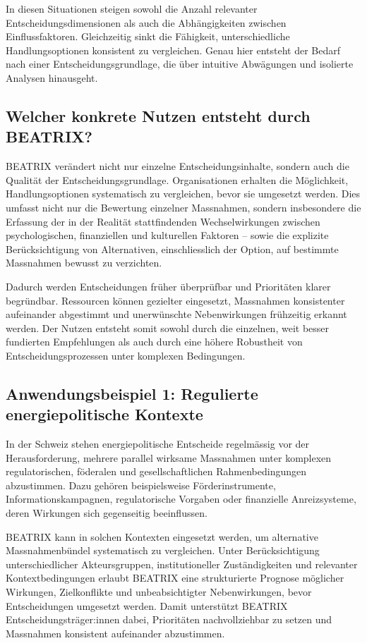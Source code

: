 \documentclass[11pt,a4paper]{article}
\begin{document}
In diesen Situationen steigen sowohl die Anzahl relevanter Entscheidungsdimensionen als auch die Abhängigkeiten zwischen Einflussfaktoren. Gleichzeitig sinkt die Fähigkeit, unterschiedliche Handlungsoptionen konsistent zu vergleichen. Genau hier entsteht der Bedarf nach einer Entscheidungsgrundlage, die über intuitive Abwägungen und isolierte Analysen hinausgeht.

\subsection{Welcher konkrete Nutzen entsteht durch BEATRIX?}

BEATRIX verändert nicht nur einzelne Entscheidungsinhalte, sondern auch die Qualität der Entscheidungsgrundlage. Organisationen erhalten die Möglichkeit, Handlungsoptionen systematisch zu vergleichen, bevor sie umgesetzt werden. Dies umfasst nicht nur die Bewertung einzelner Massnahmen, sondern insbesondere die Erfassung der in der Realität stattfindenden Wechselwirkungen zwischen psychologischen, finanziellen und kulturellen Faktoren -- sowie die explizite Berücksichtigung von Alternativen, einschliesslich der Option, auf bestimmte Massnahmen bewusst zu verzichten.

Dadurch werden Entscheidungen früher überprüfbar und Prioritäten klarer begründbar. Ressourcen können gezielter eingesetzt, Massnahmen konsistenter aufeinander abgestimmt und unerwünschte Nebenwirkungen frühzeitig erkannt werden. Der Nutzen entsteht somit sowohl durch die einzelnen, weit besser fundierten Empfehlungen als auch durch eine höhere Robustheit von Entscheidungsprozessen unter komplexen Bedingungen.

\subsection{Anwendungsbeispiel 1: Regulierte energiepolitische Kontexte}

In der Schweiz stehen energiepolitische Entscheide regelmässig vor der Herausforderung, mehrere parallel wirksame Massnahmen unter komplexen regulatorischen, föderalen und gesellschaftlichen Rahmenbedingungen abzustimmen. Dazu gehören beispielsweise Förderinstrumente, Informationskampagnen, regulatorische Vorgaben oder finanzielle Anreizsysteme, deren Wirkungen sich gegenseitig beeinflussen.

BEATRIX kann in solchen Kontexten eingesetzt werden, um alternative Massnahmenbündel systematisch zu vergleichen. Unter Berücksichtigung unterschiedlicher Akteursgruppen, institutioneller Zuständigkeiten und relevanter Kontextbedingungen erlaubt BEATRIX eine strukturierte Prognose möglicher Wirkungen, Zielkonflikte und unbeabsichtigter Nebenwirkungen, bevor Entscheidungen umgesetzt werden. Damit unterstützt BEATRIX Entscheidungsträger:innen dabei, Prioritäten nachvollziehbar zu setzen und Massnahmen konsistent aufeinander abzustimmen.
\end{document}
